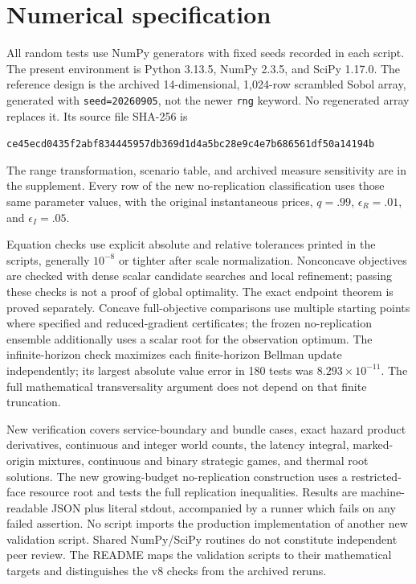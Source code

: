 \section{Numerical specification}
\label{app:numerical}
All random tests use NumPy generators with fixed seeds recorded in each
script. The present environment is Python 3.13.5, NumPy 2.3.5, and SciPy
1.17.0. The reference design is the archived 14-dimensional, 1,024-row
scrambled Sobol array, generated with \texttt{seed=20260905}, not the
newer \texttt{rng} keyword. No regenerated array replaces it. Its source
file SHA-256 is
\begin{center}\scriptsize\texttt{ce45ecd0435f2abf834445957db369d1d4a5bc28e9c4e7b686561df50a14194b}\end{center}
The range transformation, scenario table, and archived measure sensitivity
are in the supplement. Every row of the new no-replication classification
uses those same parameter values, with the original instantaneous prices,
$q=.99$, $\epsilon_R=.01$, and $\epsilon_I=.05$.

Equation checks use explicit absolute and relative tolerances printed in
the scripts, generally $10^{-8}$ or tighter after scale normalization.
Nonconcave objectives are checked with dense scalar candidate searches and
local refinement; passing these checks is not a proof of global optimality.
The exact endpoint theorem is proved separately. Concave full-objective
comparisons use multiple starting points where specified and reduced-gradient
certificates; the frozen no-replication ensemble additionally uses a scalar
root for the observation optimum. The infinite-horizon check maximizes each
finite-horizon Bellman update independently; its largest absolute value
error in 180 tests was $8.293\times10^{-11}$. The full mathematical
transversality argument does not depend on that finite truncation.

New verification covers service-boundary and bundle cases, exact hazard
product derivatives, continuous and integer world counts, the latency
integral, marked-origin mixtures, continuous and binary strategic games,
and thermal root solutions. The new growing-budget no-replication
construction uses a restricted-face resource root and tests the full
replication inequalities. Results are machine-readable JSON plus literal
stdout, accompanied by a runner which fails on any failed assertion.
No script imports the production implementation of another new validation
script. Shared NumPy/SciPy routines do not constitute independent peer review.
The README maps the validation scripts to their mathematical targets and
distinguishes the v8 checks from the archived reruns.
